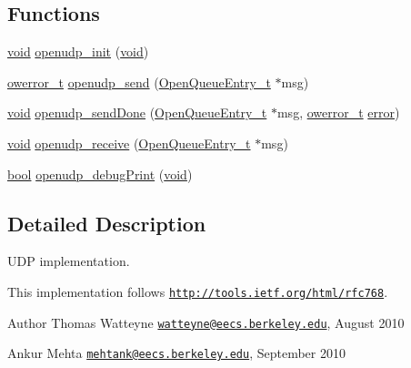 \subsection*{Functions}
\begin{DoxyCompactItemize}
\item 
\hyperlink{usb__devapi_8h_afabf60e7f57651d6d595a02c75f07cd0}{void} \hyperlink{group___open_udp_ga450461228176c199d0e117a678c7f4ac}{openudp\+\_\+init} (\hyperlink{usb__devapi_8h_afabf60e7f57651d6d595a02c75f07cd0}{void})
\item 
\hyperlink{opendefs_8h_af20b7c3ed9d2ba19e56a309ad9314803}{owerror\+\_\+t} \hyperlink{group___open_udp_ga9e3ddc36106b92231cf7cfb3b5cabbd4}{openudp\+\_\+send} (\hyperlink{struct_open_queue_entry__t}{Open\+Queue\+Entry\+\_\+t} $\ast$msg)
\item 
\hyperlink{usb__devapi_8h_afabf60e7f57651d6d595a02c75f07cd0}{void} \hyperlink{group___open_udp_ga30228c5d4c8404ec4125ca154badbe71}{openudp\+\_\+send\+Done} (\hyperlink{struct_open_queue_entry__t}{Open\+Queue\+Entry\+\_\+t} $\ast$msg, \hyperlink{opendefs_8h_af20b7c3ed9d2ba19e56a309ad9314803}{owerror\+\_\+t} \hyperlink{disk_8c_ad018a3100b2dabad325a0800152db297}{error})
\item 
\hyperlink{usb__devapi_8h_afabf60e7f57651d6d595a02c75f07cd0}{void} \hyperlink{group___open_udp_gadeef7f3934e35ea47f1869a27252ac93}{openudp\+\_\+receive} (\hyperlink{struct_open_queue_entry__t}{Open\+Queue\+Entry\+\_\+t} $\ast$msg)
\item 
\hyperlink{_p_e___types_8h_a97a80ca1602ebf2303258971a2c938e2}{bool} \hyperlink{group___open_udp_ga43198de200180ae39edfdcd5faa7c400}{openudp\+\_\+debug\+Print} (\hyperlink{usb__devapi_8h_afabf60e7f57651d6d595a02c75f07cd0}{void})
\end{DoxyCompactItemize}


\subsection{Detailed Description}
U\+DP implementation. 

This implementation follows \href{http://tools.ietf.org/html/rfc768}{\tt http\+://tools.\+ietf.\+org/html/rfc768}.

\begin{DoxyAuthor}{Author}
Thomas Watteyne \href{mailto:watteyne@eecs.berkeley.edu}{\tt watteyne@eecs.\+berkeley.\+edu}, August 2010 

Ankur Mehta \href{mailto:mehtank@eecs.berkeley.edu}{\tt mehtank@eecs.\+berkeley.\+edu}, September 2010 
\end{DoxyAuthor}


